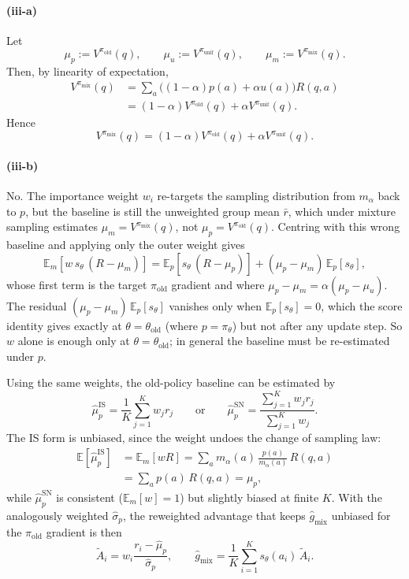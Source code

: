 \documentclass[11pt]{article}
\newcommand{\E}{\mathbb{E}}
\begin{document}
\paragraph{(iii-a)}
Let
\[
    \mu_p:=V^{\pi_{\mathrm{old}}}(q),
    \qquad
    \mu_u:=V^{\pi_{\mathrm{unif}}}(q),
    \qquad
    \mu_m:=V^{\pi_{\mathrm{mix}}}(q).
\]
Then, by linearity of expectation,
\[
\begin{aligned}
    V^{\pi_{\mathrm{mix}}}(q)
    &=
    \sum_a \bigl((1-\alpha)p(a)+\alpha u(a)\bigr)R(q,a) \\
    &=
    (1-\alpha)V^{\pi_{\mathrm{old}}}(q)
    +
    \alpha V^{\pi_{\mathrm{unif}}}(q).
\end{aligned}
\]
Hence
\[
    V^{\pi_{\mathrm{mix}}}(q)
    =
    (1-\alpha)V^{\pi_{\mathrm{old}}}(q)
    +
    \alpha V^{\pi_{\mathrm{unif}}}(q).
\]

\paragraph{(iii-b)}
No. The importance weight $w_i$ re-targets the sampling distribution from $m_\alpha$ back to $p$, but the baseline is still the unweighted group mean $\bar r$, which under mixture sampling estimates $\mu_m=V^{\pi_{\mathrm{mix}}}(q)$, not $\mu_p=V^{\pi_{\mathrm{old}}}(q)$. Centring with this wrong baseline and applying only the outer weight gives
\[
    \E_m\!\left[w\,s_\theta\,(R-\mu_m)\right]
    =
    \E_p\!\left[s_\theta\,(R-\mu_p)\right]
    +(\mu_p-\mu_m)\,\E_p[s_\theta],
\]
whose first term is the target $\pi_{\mathrm{old}}$ gradient and where $\mu_p-\mu_m=\alpha(\mu_p-\mu_u)$. The residual $(\mu_p-\mu_m)\,\E_p[s_\theta]$ vanishes only when $\E_p[s_\theta]=0$, which the score identity gives exactly at $\theta=\theta_{\mathrm{old}}$ (where $p=\pi_\theta$) but not after any update step. So $w$ alone is enough only at $\theta=\theta_{\mathrm{old}}$; in general the baseline must be re-estimated under $p$.

Using the same weights, the old-policy baseline can be estimated by
\[
    \widehat\mu_p^{\mathrm{IS}}=\frac1K\sum_{j=1}^K w_jr_j
    \qquad\text{or}\qquad
    \widehat\mu_p^{\mathrm{SN}}=\frac{\sum_{j=1}^K w_jr_j}{\sum_{j=1}^K w_j}.
\]
The IS form is unbiased, since the weight undoes the change of sampling law:
\[
\begin{aligned}
    \E\!\left[\widehat\mu_p^{\mathrm{IS}}\right]
    &=\E_m[wR]
    =\sum_a m_\alpha(a)\,\frac{p(a)}{m_\alpha(a)}\,R(q,a)\\
    &=\sum_a p(a)\,R(q,a)=\mu_p,
\end{aligned}
\]
while $\widehat\mu_p^{\mathrm{SN}}$ is consistent ($\E_m[w]=1$) but slightly biased at finite $K$. With the analogously weighted $\widehat\sigma_p$, the reweighted advantage that keeps $\widehat g_{\mathrm{mix}}$ unbiased for the $\pi_{\mathrm{old}}$ gradient is then
\[
    \widetilde A_i=w_i\frac{r_i-\widehat\mu_p}{\widehat\sigma_p},
    \qquad
    \widehat g_{\mathrm{mix}}=\frac1K\sum_{i=1}^K s_\theta(a_i)\,\widetilde A_i.
\]
\end{document}
